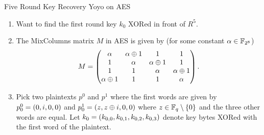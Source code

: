 \documentclass[notheorems]{beamer}
\theoremstyle{definition}
\theoremstyle{example}
\begin{document}
    \begin{frame}[<+->]{Five Round Key Recovery Yoyo on AES}
        \begin{enumerate}
            \item Want to find the first round key \(k_0\) XORed in front of
            \(R^5\). 
            \item The MixColumns matrix \(M\) in AES is given by (for some
            constant \(\alpha \in \mathbb F_{2^8}\))
            \begin{equation}
                M = \begin{pmatrix}
                    \alpha & \alpha \oplus 1 & 1 & 1 \\
                    1 & \alpha & \alpha \oplus 1 & 1 \\
                    1 & 1 & \alpha & \alpha \oplus 1 \\
                    \alpha \oplus 1 & 1 & 1 & \alpha
                \end{pmatrix}.
            \end{equation}
            \item Pick two plaintexts \(p^0\) and \(p^1\) where the first
            words are given by \(p_0^0 = (0, i, 0, 0)\) and \(p_0^1 =
            (z, z \oplus i, 0, 0)\) where \(z \in \mathbb F_q \setminus
            \{0\}\) and the three other words are equal. Let \(k_0 =
            (k_{0, 0}, k_{0, 1}, k_{0, 2}, k_{0, 3})\) denote key bytes
            XORed with the first word of the plaintext. 
        \end{enumerate}
    \end{frame}
\end{document}
